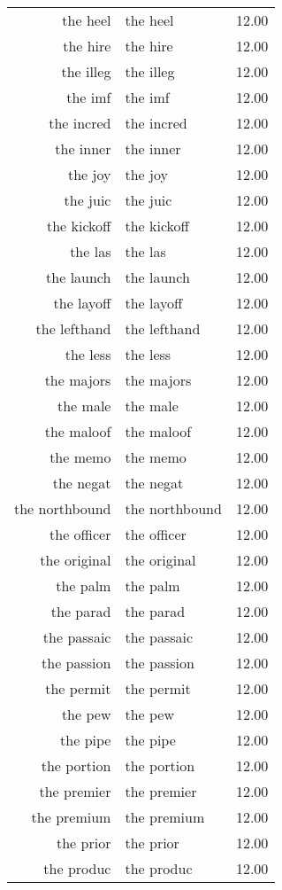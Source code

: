 \begin{table}[ht]
\begin{tabular}{rlr}
  the heel & the heel & 12.00 \\ 
  the hire & the hire & 12.00 \\ 
  the illeg & the illeg & 12.00 \\ 
  the imf & the imf & 12.00 \\ 
  the incred & the incred & 12.00 \\ 
  the inner & the inner & 12.00 \\ 
  the joy & the joy & 12.00 \\ 
  the juic & the juic & 12.00 \\ 
  the kickoff & the kickoff & 12.00 \\ 
  the las & the las & 12.00 \\ 
  the launch & the launch & 12.00 \\ 
  the layoff & the layoff & 12.00 \\ 
  the lefthand & the lefthand & 12.00 \\ 
  the less & the less & 12.00 \\ 
  the majors & the majors & 12.00 \\ 
  the male & the male & 12.00 \\ 
  the maloof & the maloof & 12.00 \\ 
  the memo & the memo & 12.00 \\ 
  the negat & the negat & 12.00 \\ 
  the northbound & the northbound & 12.00 \\ 
  the officer & the officer & 12.00 \\ 
  the original & the original & 12.00 \\ 
  the palm & the palm & 12.00 \\ 
  the parad & the parad & 12.00 \\ 
  the passaic & the passaic & 12.00 \\ 
  the passion & the passion & 12.00 \\ 
  the permit & the permit & 12.00 \\ 
  the pew & the pew & 12.00 \\ 
  the pipe & the pipe & 12.00 \\ 
  the portion & the portion & 12.00 \\ 
  the premier & the premier & 12.00 \\ 
  the premium & the premium & 12.00 \\ 
  the prior & the prior & 12.00 \\ 
  the produc & the produc & 12.00 \\ 

\end{tabular}
\end{table}
